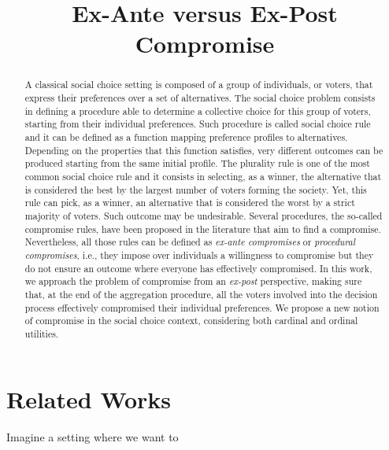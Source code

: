 \documentclass[version=3.21, pagesize, notitlepage, twoside=off, bibliography=totoc, DIV=calc, fontsize=11.5pt, a4paper]{scrartcl}
\title{Ex-Ante versus Ex-Post \\ Compromise}
\author{}
\date{}
\begin{document}
\maketitle
\thispagestyle{empty}

\begin{abstract}
	A classical social choice setting is composed of a group of individuals, or voters, that express their preferences over a set of alternatives. The social choice problem consists in defining a procedure able to determine a collective choice for this group of voters, starting from their individual preferences. Such procedure is called social choice rule and it can be defined as a function mapping preference profiles to alternatives. Depending on the properties that this function satisfies, very different outcomes can be produced starting from the same initial profile. The plurality rule is one of the most common social choice rule and it consists in selecting, as a winner, the alternative that is considered the best by the largest number of voters forming the society. Yet, this rule can pick, as a winner, an alternative that is considered the worst by a strict majority of voters. Such outcome may be undesirable. Several procedures, the so-called compromise rules, have been proposed in the literature that aim to find a compromise. Nevertheless, all those rules can be defined as \textit{ex-ante compromises} or \textit{procedural compromises}, i.e., they impose over individuals a willingness to compromise but they do not ensure an outcome where everyone has effectively compromised. In this work, we approach the problem of compromise from an \textit{ex-post} perspective, making sure that, at the end of the aggregation procedure, all the voters involved into the decision process effectively compromised their individual preferences.   We propose a new notion of compromise in the social choice context, considering both cardinal and ordinal utilities. 
\end{abstract}

\pagebreak

\section{Related Works}
	
	
	Imagine a setting where we want to 
	
\end{document}
